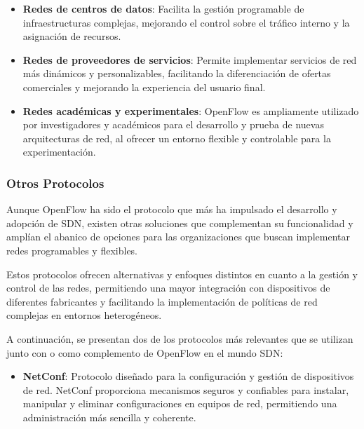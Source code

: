 {                    \begin{itemize}
                        \item \textbf{Redes de centros de datos}: Facilita la gestión programable de infraestructuras complejas, mejorando el control sobre el tráfico interno y la asignación de recursos.
                        
                        \item \textbf{Redes de proveedores de servicios}: Permite implementar servicios de red más dinámicos y personalizables, facilitando la diferenciación de ofertas comerciales y mejorando la experiencia del usuario final.
                        
                        \item \textbf{Redes académicas y experimentales}: OpenFlow es ampliamente utilizado por investigadores y académicos para el desarrollo y prueba de nuevas arquitecturas de red, al ofrecer un entorno flexible y controlable para la experimentación.
                    \end{itemize}
            
            \subsubsection{Otros Protocolos}
                Aunque OpenFlow ha sido el protocolo que más ha impulsado el desarrollo y adopción de SDN, existen otras soluciones que complementan su funcionalidad y amplían el abanico de opciones para las organizaciones que buscan implementar redes programables y flexibles.
                
                Estos protocolos ofrecen alternativas y enfoques distintos en cuanto a la gestión y control de las redes, permitiendo una mayor integración con dispositivos de diferentes fabricantes y facilitando la implementación de políticas de red complejas en entornos heterogéneos.
                
                A continuación, se presentan dos de los protocolos más relevantes que se utilizan junto con o como complemento de OpenFlow en el mundo SDN:
            
                \begin{itemize}
                    \item \textbf{NetConf}: Protocolo diseñado para la configuración y gestión de dispositivos de red. NetConf proporciona mecanismos seguros y confiables para instalar, manipular y eliminar configuraciones en equipos de red, permitiendo una administración más sencilla y coherente.
                    

\end{itemize}}
